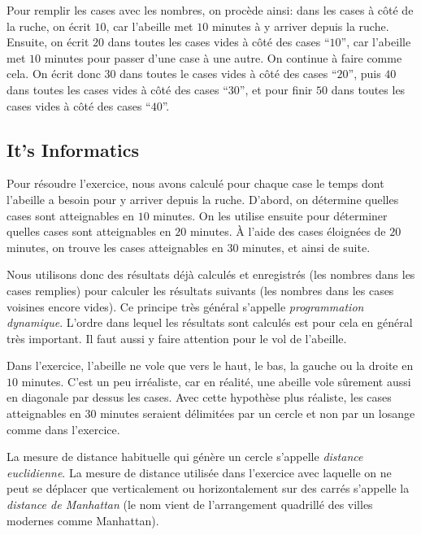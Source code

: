 \documentclass[a4paper,11pt]{report}
\newcommand{\taskGraphicsFolder}{..}
\begin{document}
{\centering%
\par}

Pour remplir les cases avec les nombres, on procède ainsi: dans les cases à côté de la ruche, on écrit $10$, car l’abeille met $10$ minutes à y arriver depuis la ruche. Ensuite, on écrit $20$ dans toutes les cases vides à côté des cases “$10$”, car l’abeille met $10$ minutes pour passer d’une case à une autre. On continue à faire comme cela. On écrit donc $30$ dans toutes le cases vides à côté des cases “$20$”, puis $40$ dans toutes les cases vides à côté des cases “$30$”, et pour finir $50$ dans toutes les cases vides à côté des cases “$40$”.


\subsection*{It’s Informatics}

Pour résoudre l’exercice, nous avons calculé pour chaque case le temps dont l’abeille a besoin pour y arriver depuis la ruche. D’abord, on détermine quelles cases sont atteignables en $10$ minutes. On les utilise ensuite pour déterminer quelles cases sont atteignables en $20$ minutes. À l’aide des cases éloignées de $20$ minutes, on trouve les cases atteignables en $30$ minutes, et ainsi de suite.

Nous utilisons donc des résultats déjà calculés et enregistrés (les nombres dans les cases remplies) pour calculer les résultats suivants (les nombres dans les cases voisines encore vides). Ce principe très général s’appelle \emph{programmation dynamique}. L’ordre dans lequel les résultats sont calculés est pour cela en général très important. Il faut aussi y faire attention pour le vol de l’abeille.

Dans l’exercice, l’abeille ne vole que vers le haut, le bas, la gauche ou la droite en $10$ minutes. C’est un peu irréaliste, car en réalité, une abeille vole sûrement aussi en diagonale par dessus les cases. Avec cette hypothèse plus réaliste, les cases atteignables en $30$ minutes seraient délimitées par un cercle et non par un losange comme dans l’exercice.

La mesure de distance habituelle qui génère un cercle s’appelle \emph{distance euclidienne}. La mesure de distance utilisée dans l’exercice avec laquelle on ne peut se déplacer que verticalement ou horizontalement sur des carrés s’appelle la \emph{distance de Manhattan} (le nom vient de l’arrangement quadrillé des villes modernes comme Manhattan).
\end{document}
